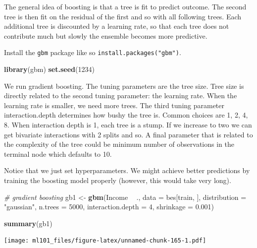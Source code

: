 \documentclass[]{article}
\newenvironment{Shaded}{\begin{snugshade}}{\end{snugshade}}
\newcommand{\CommentTok}[1]{\textcolor[rgb]{0.56,0.35,0.01}{\textit{#1}}}
\newcommand{\DataTypeTok}[1]{\textcolor[rgb]{0.13,0.29,0.53}{#1}}
\newcommand{\DecValTok}[1]{\textcolor[rgb]{0.00,0.00,0.81}{#1}}
\newcommand{\FloatTok}[1]{\textcolor[rgb]{0.00,0.00,0.81}{#1}}
\newcommand{\KeywordTok}[1]{\textcolor[rgb]{0.13,0.29,0.53}{\textbf{#1}}}
\newcommand{\NormalTok}[1]{#1}
\newcommand{\OperatorTok}[1]{\textcolor[rgb]{0.81,0.36,0.00}{\textbf{#1}}}
\newcommand{\StringTok}[1]{\textcolor[rgb]{0.31,0.60,0.02}{#1}}
\begin{document}
The general idea of boosting is that a tree is fit to predict outcome. The second tree is then fit on the residual of the first and so with all following trees. Each additional tree is discounted by a learning rate, so that each tree does not contribute much but slowly the ensemble becomes more predictive.

Install the \texttt{gbm} package like so \texttt{install.packages("gbm")}.

\begin{Shaded}
\begin{Highlighting}[]
\KeywordTok{library}\NormalTok{(gbm)}
\KeywordTok{set.seed}\NormalTok{(}\DecValTok{1234}\NormalTok{)}
\end{Highlighting}
\end{Shaded}

We run gradient boosting. The tuning parameters are the tree size. Tree size is directly related to the second tuning parameter: the learning rate. When the learning rate is smaller, we need more trees. The third tuning parameter interaction.depth determines how bushy the tree is. Common choices are 1, 2, 4, 8. When interaction depth is 1, each tree is a stump. If we increase to two we can get bivariate interactions with 2 splits and so. A final parameter that is related to the complexity of the tree could be minimum number of observations in the terminal node which defaults to 10.

Notice that we just set hyperparameters. We might achieve better predictions by training the boosting model properly (however, this would take very long).

\begin{Shaded}
\begin{Highlighting}[]
\CommentTok{# gradient boosting}
\NormalTok{gb1 <-}\StringTok{ }\KeywordTok{gbm}\NormalTok{(Income }\OperatorTok{~}\StringTok{ }\NormalTok{., }\DataTypeTok{data =}\NormalTok{ bes[train, ], }
           \DataTypeTok{distribution =} \StringTok{"gaussian"}\NormalTok{, }
           \DataTypeTok{n.trees =} \DecValTok{5000}\NormalTok{, }
           \DataTypeTok{interaction.depth =} \DecValTok{4}\NormalTok{,}
           \DataTypeTok{shrinkage =} \FloatTok{0.001}\NormalTok{)}

\KeywordTok{summary}\NormalTok{(gb1)}
\end{Highlighting}
\end{Shaded}

\texttt{[image: ml101\_files/figure-latex/unnamed-chunk-165-1.pdf]}
\end{document}
